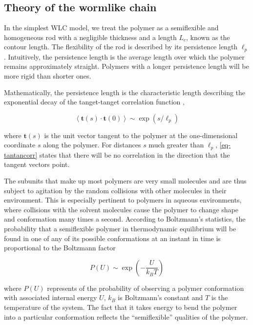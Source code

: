 \documentclass[11pt]{article}
\begin{document}
\subsection{Theory of the wormlike chain}
\label{sec-3-2}
In the simplest WLC model, we treat the polymer as a semiflexible and
homogeneous rod with a negligible thickness and a length $L_c$, known
as the contour length. The flexibility of the rod is described by its
persistence length $\ell_p$. Intuitively, the persistence length is
the average length over which the polymer remains approximately
straight. Polymers with a longer persistence length will be more rigid
than shorter ones.

Mathematically, the persistence length is the characteristic length
describing the exponential decay of the tanget-tanget correlation
function \cite{phillips-pbotc-2009},


\begin{equation}
  \label{eq-tantancorr}
  \left< \mathbf{t} \left( s \right) \cdot \mathbf{t} \left( 0 \right) \right> \sim \exp \left( s / \ell_p \right)
\end{equation}

where $\mathbf{t} \left( s \right)$ is the unit vector tangent to the
polymer at the one-dimensional coordinate $s$ along the polymer. For
distances $s$ much greater than $\ell_p$, \eqref{eq-tantancorr}
states that there will be no correlation in the direction that the
tangent vectors point.

The subunits that make up most polymers are very small molecules and
are thus subject to agitation by the random collisions with other
molecules in their environment. This is especially pertinent to
polymers in aqueous environments, where collisions with the solvent
molecules cause the polymer to change shape and conformation many
times a second. According to Boltzmann's statistics, the probability
that a semiflexible polymer in thermodynamic equilibrium will be found
in one of any of its possible conformations at an instant in time is
proportional to the Boltzmann factor

\begin{equation}
  P \left( U \right) \sim \exp \left( -\frac{U}{k_B T}\right)
\end{equation}

where $P \left( U \right)$ represents of the probability of observing
a polymer conformation with associated internal energy $U$, $k_B$ is
Boltzmann's constant and $T$ is the temperature of the system. The
fact that it takes energy to bend the polymer into a particular
conformation reflects the ``semiflexible'' qualities of the polymer.
\end{document}
